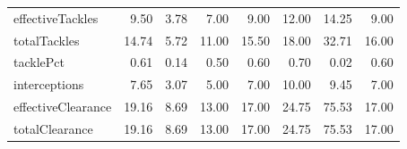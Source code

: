 \begin{table}[H]
\begin{tabular}{lrrrrrrr}
effectiveTackles & 9.50 & 3.78 & 7.00 & 9.00 & 12.00 & 14.25 & 9.00 \\
totalTackles & 14.74 & 5.72 & 11.00 & 15.50 & 18.00 & 32.71 & 16.00 \\
tacklePct & 0.61 & 0.14 & 0.50 & 0.60 & 0.70 & 0.02 & 0.60 \\
interceptions & 7.65 & 3.07 & 5.00 & 7.00 & 10.00 & 9.45 & 7.00 \\
effectiveClearance & 19.16 & 8.69 & 13.00 & 17.00 & 24.75 & 75.53 & 17.00 \\
totalClearance & 19.16 & 8.69 & 13.00 & 17.00 & 24.75 & 75.53 & 17.00 \\
\hline
\end{tabular}
\end{table}
